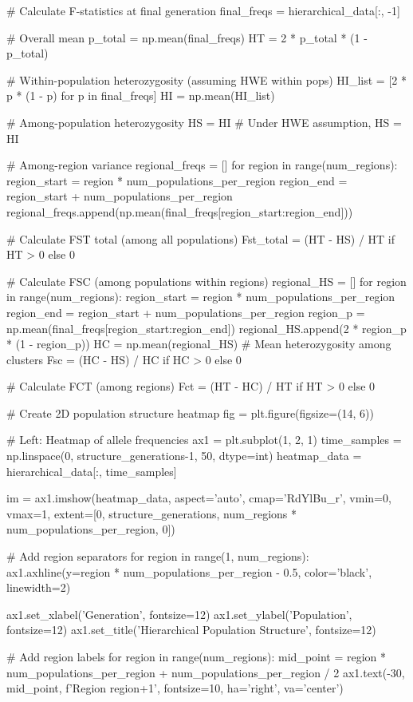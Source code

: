 \documentclass[11pt,a4paper]{article}
\begin{document}
\begin{pycode}
# Calculate F-statistics at final generation
final_freqs = hierarchical_data[:, -1]

# Overall mean
p_total = np.mean(final_freqs)
HT = 2 * p_total * (1 - p_total)

# Within-population heterozygosity (assuming HWE within pops)
HI_list = [2 * p * (1 - p) for p in final_freqs]
HI = np.mean(HI_list)

# Among-population heterozygosity
HS = HI  # Under HWE assumption, HS = HI

# Among-region variance
regional_freqs = []
for region in range(num_regions):
    region_start = region * num_populations_per_region
    region_end = region_start + num_populations_per_region
    regional_freqs.append(np.mean(final_freqs[region_start:region_end]))

# Calculate FST total (among all populations)
Fst_total = (HT - HS) / HT if HT > 0 else 0

# Calculate FSC (among populations within regions)
regional_HS = []
for region in range(num_regions):
    region_start = region * num_populations_per_region
    region_end = region_start + num_populations_per_region
    region_p = np.mean(final_freqs[region_start:region_end])
    regional_HS.append(2 * region_p * (1 - region_p))
HC = np.mean(regional_HS)  # Mean heterozygosity among clusters
Fsc = (HC - HS) / HC if HC > 0 else 0

# Calculate FCT (among regions)
Fct = (HT - HC) / HT if HT > 0 else 0

# Create 2D population structure heatmap
fig = plt.figure(figsize=(14, 6))

# Left: Heatmap of allele frequencies
ax1 = plt.subplot(1, 2, 1)
time_samples = np.linspace(0, structure_generations-1, 50, dtype=int)
heatmap_data = hierarchical_data[:, time_samples]

im = ax1.imshow(heatmap_data, aspect='auto', cmap='RdYlBu_r', vmin=0, vmax=1,
                extent=[0, structure_generations, num_regions * num_populations_per_region, 0])

# Add region separators
for region in range(1, num_regions):
    ax1.axhline(y=region * num_populations_per_region - 0.5, color='black', linewidth=2)

ax1.set_xlabel('Generation', fontsize=12)
ax1.set_ylabel('Population', fontsize=12)
ax1.set_title('Hierarchical Population Structure', fontsize=12)

# Add region labels
for region in range(num_regions):
    mid_point = region * num_populations_per_region + num_populations_per_region / 2
    ax1.text(-30, mid_point, f'Region {region+1}', fontsize=10, ha='right', va='center')


\end{pycode}
\end{document}

